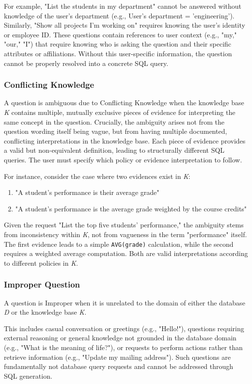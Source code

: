 For example, "List the students in my department" cannot be answered without knowledge of the user's department (e.g., User's department = 'engineering'). Similarly, "Show all projects I'm working on" requires knowing the user's identity or employee ID. These questions contain references to user context (e.g., "my," "our," "I") that require knowing who is asking the question and their specific attributes or affiliations. Without this user-specific information, the question cannot be properly resolved into a concrete SQL query.

\subsubsection{Conflicting Knowledge}
A question is ambiguous due to Conflicting Knowledge when the knowledge base \textit{K} contains multiple, mutually exclusive pieces of evidence for interpreting the same concept in the question. Crucially, the ambiguity arises not from the question wording itself being vague, but from having multiple documented, conflicting interpretations in the knowledge base. Each piece of evidence provides a valid but non-equivalent definition, leading to structurally different SQL queries. The user must specify which policy or evidence interpretation to follow.

For instance, consider the case where two evidences exist in \textit{K}: 
\begin{enumerate}
    \item "A student's performance is their average grade"
    \item "A student's performance is the average grade weighted by the course credits"
\end{enumerate}

Given the request "List the top five students' performance," the ambiguity stems from inconsistency within \textit{K}, not from vagueness in the term "performance" itself. The first evidence leads to a simple \texttt{AVG(grade)} calculation, while the second requires a weighted average computation. Both are valid interpretations according to different policies in \textit{K}.

\subsubsection{Improper Question}
A question is Improper when it is unrelated to the domain of either the database \textit{D} or the knowledge base \textit{K}.

This includes casual conversation or greetings (e.g., "Hello!"), questions requiring external reasoning or general knowledge not grounded in the database domain (e.g., "What is the meaning of life?"), or requests to perform actions rather than retrieve information (e.g., "Update my mailing address"). Such questions are fundamentally not database query requests and cannot be addressed through SQL generation.
